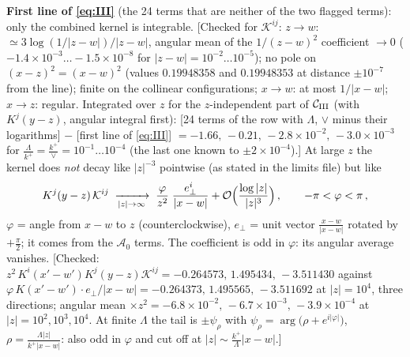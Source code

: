 \documentclass[9pt]{article}
\numberwithin{equation}{section}
\begin{document}
\noindent\textbf{First line of \eqref{eq:III}} (the 24 terms that are neither of the two flagged terms): only the combined kernel is integrable. {\color{gray}\small [Checked for $\mathcal{K}^{ij}$: $z\to w$: $\simeq3\log(1/|z-w|)/|z-w|$, angular mean of the $1/(z-w)^{2}$ coefficient $\to0$ ($-1.4\times10^{-3}\dots-1.5\times10^{-8}$ for $|z-w|=10^{-2}\dots10^{-5}$); no pole on $(x-z)^{2}=(x-w)^{2}$ (values $0.19948358$ and $0.19948353$ at distance $\pm10^{-7}$ from the line); finite on the collinear configurations; $x\to w$: at most $1/|x-w|$; $x\to z$: regular. Integrated over $z$ for the $z$-independent part of $\mathcal{C}_{\rm III}$ (with $K^{j}(y-z)$, angular integral first): [24 terms of the row with $\Lambda$, $\vee$ minus their logarithms] $-$ [first line of \eqref{eq:III}] $=-1.66,\,-0.21,\,-2.8\times10^{-2},\,-3.0\times10^{-3}$ for $\frac{\Lambda}{k^{+}}=\frac{k^{+}}{\vee}=10^{-1}\dots10^{-4}$ (the last one known to $\pm2\times10^{-4}$).]} At large $z$ the kernel does \emph{not} decay like $|z|^{-3}$ pointwise (as stated in the limits file) but like
\begin{align}
K^{j}(y-z)\,\mathcal{K}^{ij}\;\xrightarrow[|z|\to\infty]{}\;\frac{\varphi}{z^{2}}\;\frac{e_{\perp}^{i}}{|x-w|}+{\cal O}\Big(\frac{\log|z|}{|z|^{3}}\Big)\,,\qquad -\pi<\varphi<\pi\,,\label{eq:saw}
\end{align}
$\varphi$ = angle from $x-w$ to $z$ (counterclockwise), $e_{\perp}$ = unit vector $\frac{x-w}{|x-w|}$ rotated by $+\frac{\pi}{2}$; it comes from the $\mathcal{A}_{0}$ terms. The coefficient is odd in $\varphi$: its angular average vanishes. {\color{gray}\small [Checked: $z^{2}\,K^{i}(x'-w')K^{j}(y-z)\mathcal{K}^{ij}=-0.264573,\,1.495434,\,-3.511430$ against $\varphi\,K(x'-w')\cdot e_{\perp}/|x-w|=-0.264373,\,1.495565,\,-3.511692$ at $|z|=10^{4}$, three directions; angular mean $\times z^{2}=-6.8\times10^{-2},\,-6.7\times10^{-3},\,-3.9\times10^{-4}$ at $|z|=10^{2},10^{3},10^{4}$. At finite $\Lambda$ the tail is $\pm\psi_{\rho}$ with $\psi_{\rho}=\arg\big(\rho+e^{i|\varphi|}\big)$, $\rho=\frac{\Lambda|z|}{k^{+}|x-w|}$: also odd in $\varphi$ and cut off at $|z|\sim\frac{k^{+}}{\Lambda}|x-w|$.]}

\end{document}
